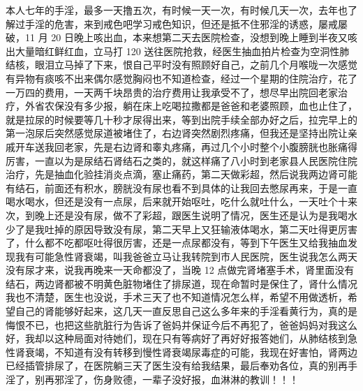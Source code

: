 \begin{case}
    本人七年的手淫，最多一天撸五次，有时候一天一次，有时候几天一次，去年也了解过手淫的危害，来到戒色吧学习戒色知识，但还是抵不住邪淫的诱惑，屡戒屡破，11 月 20 日晚上咳出血，本来想第二天去医院检查，没想到晚上睡到半夜又咳出大量暗红鲜红血，立马打 120 送往医院抢救，经医生抽血拍片检查为空洞性肺结核，眼泪立马掉了下来，恨自己平时没有照顾好自己，之前几个月喉咙一次感觉有异物有痰咳不出来偶尔感觉胸闷也不知道检查，经过一个星期的住院治疗，花了一万四的费用，一天两千块昂贵的治疗费用让我承受不了，想尽早出院回老家治疗，外省农保没有多少报，躺在床上吃喝拉撒都是爸爸和老婆照顾，血也止住了，就是拉尿的时候要等几十秒才尿得出来，等到出院手续全部办好之后，拉完早上的第一泡尿后突然感觉尿道被堵住了，右边肾突然剧烈疼痛，但我还是坚持出院让亲戚开车送我回老家，先是右边肾和睾丸疼痛，再过几个小时整个小腹膀胱也胀痛得厉害，一直以为是尿结石肾结石之类的，就这样痛了八小时到老家县人民医院住院治疗，先是抽血化验挂消炎点滴，塞止痛药，第二天做彩超，然后说我两边肾可能有结石，前面还有积水，膀胱没有尿也看不到具体的让我回去憋尿再来，于是一直喝水喝水，但还是没有一点尿，后来就开始呕吐，吃什么就吐什么，一天吐个十来次，到晚上还是没有尿，做不了彩超，跟医生说明了情况，医生还是认为是我喝水少了是我吐掉的原因导致没有尿，第二天早上又狂输液体喝水，第二天吐得更厉害了，什么都不吃都呕吐得很厉害，还是一点尿都没有，等到下午医生又给我抽血发现我有可能急性肾衰竭，叫我爸爸立马让我转院到市人民医院，医生说我怎么两天没有尿才来，说我再晚来一天命都没了，当晚 12 点做完肾堵塞手术，肾里面没有结石，两边肾都被不明黄色脏物堵住了排尿道，现在命暂时是保住了，肾什么情况我也不清楚，医生也没说，手术三天了也不知道情况怎么样，希望不用做透析，希望自己的肾能够好起来，这几天一直反思自己这么多年来的手淫看黄行为，真的是悔恨不已，也把这些肮脏行为告诉了爸妈并保证今后不再犯了，爸爸妈妈对我这么好，我却以这种局面对待她们，现在只有等病好了再好好报答她们，从肺结核到急性肾衰竭，不知道有没有转移到慢性肾衰竭尿毒症的可能，我现在好害怕，肾两边已经插管排尿了，在医院躺三天了医生没有给我结果，最后奉劝各位，真的别再手淫了，别再邪淫了，伤身败德，一辈子没好报，血淋淋的教训！！！


\end{case}
